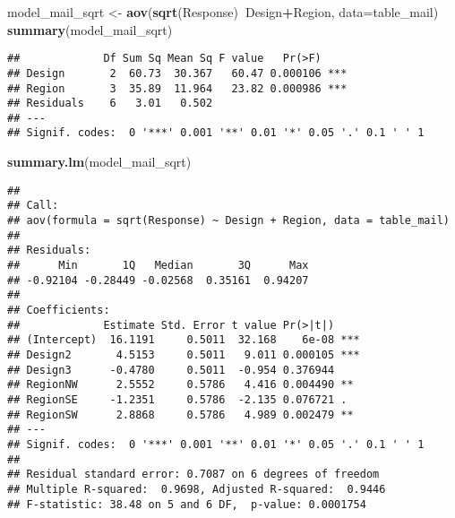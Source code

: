 \documentclass[]{article}
\newenvironment{Shaded}{\begin{snugshade}}{\end{snugshade}}
\newcommand{\CommentTok}[1]{\textcolor[rgb]{0.56,0.35,0.01}{\textit{#1}}}
\newcommand{\DataTypeTok}[1]{\textcolor[rgb]{0.13,0.29,0.53}{#1}}
\newcommand{\FloatTok}[1]{\textcolor[rgb]{0.00,0.00,0.81}{#1}}
\newcommand{\KeywordTok}[1]{\textcolor[rgb]{0.13,0.29,0.53}{\textbf{#1}}}
\newcommand{\NormalTok}[1]{#1}
\newcommand{\OperatorTok}[1]{\textcolor[rgb]{0.81,0.36,0.00}{\textbf{#1}}}
\newcommand{\StringTok}[1]{\textcolor[rgb]{0.31,0.60,0.02}{#1}}
\begin{document}
\begin{Shaded}
\begin{Highlighting}[]
\NormalTok{model_mail_sqrt <-}\StringTok{ }\KeywordTok{aov}\NormalTok{(}\KeywordTok{sqrt}\NormalTok{(Response)}\OperatorTok{~}\NormalTok{Design}\OperatorTok{+}\NormalTok{Region, }\DataTypeTok{data=}\NormalTok{table_mail)}
\KeywordTok{summary}\NormalTok{(model_mail_sqrt)}
\end{Highlighting}
\end{Shaded}

\begin{verbatim}
##             Df Sum Sq Mean Sq F value   Pr(>F)    
## Design       2  60.73  30.367   60.47 0.000106 ***
## Region       3  35.89  11.964   23.82 0.000986 ***
## Residuals    6   3.01   0.502                     
## ---
## Signif. codes:  0 '***' 0.001 '**' 0.01 '*' 0.05 '.' 0.1 ' ' 1
\end{verbatim}

\begin{Shaded}
\begin{Highlighting}[]
\KeywordTok{summary.lm}\NormalTok{(model_mail_sqrt)}
\end{Highlighting}
\end{Shaded}

\begin{verbatim}
## 
## Call:
## aov(formula = sqrt(Response) ~ Design + Region, data = table_mail)
## 
## Residuals:
##      Min       1Q   Median       3Q      Max 
## -0.92104 -0.28449 -0.02568  0.35161  0.94207 
## 
## Coefficients:
##             Estimate Std. Error t value Pr(>|t|)    
## (Intercept)  16.1191     0.5011  32.168    6e-08 ***
## Design2       4.5153     0.5011   9.011 0.000105 ***
## Design3      -0.4780     0.5011  -0.954 0.376944    
## RegionNW      2.5552     0.5786   4.416 0.004490 ** 
## RegionSE     -1.2351     0.5786  -2.135 0.076721 .  
## RegionSW      2.8868     0.5786   4.989 0.002479 ** 
## ---
## Signif. codes:  0 '***' 0.001 '**' 0.01 '*' 0.05 '.' 0.1 ' ' 1
## 
## Residual standard error: 0.7087 on 6 degrees of freedom
## Multiple R-squared:  0.9698, Adjusted R-squared:  0.9446 
## F-statistic: 38.48 on 5 and 6 DF,  p-value: 0.0001754
\end{verbatim}

\begin{Shaded}
\end{Shaded}
\end{document}
